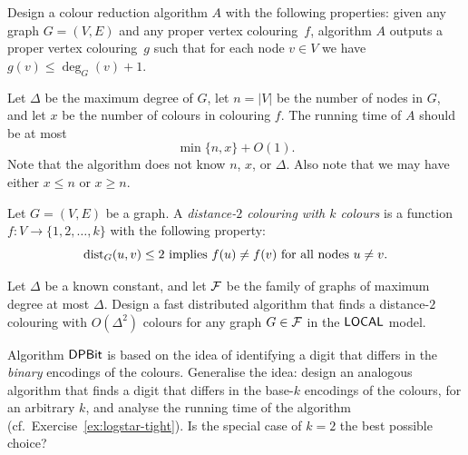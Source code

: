 \begin{ex}\label{ex:greedy-iterate}
    Design a colour reduction algorithm $A$ with the following properties:
    given any graph $G = (V,E)$ and any proper vertex colouring~$f$,
    algorithm $A$ outputs a proper vertex colouring~$g$ such that
    for each node $v \in V$ we have $g(v) \le \deg_G(v) + 1$.
    
    Let $\Delta$ be the maximum degree of $G$, let $n = |V|$ be the number of nodes in $G$, and let $x$ be the number of colours in colouring $f$. The running time of $A$ should be at most
    \[
        \min \{ n, x \} + O(1).
    \]
    Note that the algorithm does not know $n$, $x$, or $\Delta$. Also note that we may have either $x \le n$ or $x \ge n$.
    
\end{ex}

\begin{ex}\label{ex:distance2col}
    Let $G = (V,E)$ be a graph. A \emph{distance-$2$ colouring with $k$ colours} is a function $f \colon V \to \{1,2,\dotsc,k\}$ with the following property:
    \[
        \operatorname{dist}_G(u,v) \le 2 \text{ implies } f(u) \ne f(v) \text{ for all nodes } u \ne v.
    \]

    Let $\Delta$ be a known constant, and let $\mathcal{F}$ be the family of graphs of maximum degree at most $\Delta$. Design a fast distributed algorithm that finds a distance-$2$ colouring with $O(\Delta^2)$ colours for any graph $G \in \mathcal{F}$ in the $\textsf{LOCAL}$ model.
    
\end{ex}

\begin{exs}\label{ex:dpbit-base}
    Algorithm $\textsf{DPBit}$ is based on the idea of identifying a digit that differs in the \emph{binary} encodings of the colours. Generalise the idea: design an analogous algorithm that finds a digit that differs in the base-$k$ encodings of the colours, for an arbitrary $k$, and analyse the running time of the algorithm (cf.\ Exercise~\ref{ex:logstar-tight}). Is the special case of $k = 2$ the best possible choice?
\end{exs}

